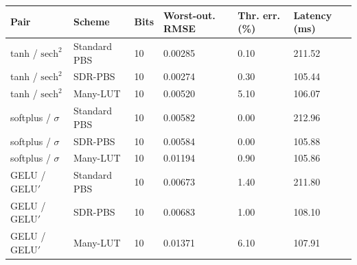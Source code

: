 \footnotesize
\setlength{\tabcolsep}{4pt}
\renewcommand{\arraystretch}{1.08}
\begin{tabular}{llllll}
\toprule
Pair & Scheme & Bits & Worst-out. RMSE & Thr. err. (\%) & Latency (ms) \\
\midrule
tanh / $\mathrm{sech}^2$ & Standard PBS & 10 & 0.00285 & 0.10 & 211.52 \\
tanh / $\mathrm{sech}^2$ & SDR-PBS & 10 & 0.00274 & 0.30 & 105.44 \\
tanh / $\mathrm{sech}^2$ & Many-LUT & 10 & 0.00520 & 5.10 & 106.07 \\
softplus / $\sigma$ & Standard PBS & 10 & 0.00582 & 0.00 & 212.96 \\
softplus / $\sigma$ & SDR-PBS & 10 & 0.00584 & 0.00 & 105.88 \\
softplus / $\sigma$ & Many-LUT & 10 & 0.01194 & 0.90 & 105.86 \\
GELU / GELU$'$ & Standard PBS & 10 & 0.00673 & 1.40 & 211.80 \\
GELU / GELU$'$ & SDR-PBS & 10 & 0.00683 & 1.00 & 108.10 \\
GELU / GELU$'$ & Many-LUT & 10 & 0.01371 & 6.10 & 107.91 \\
\bottomrule
\end{tabular}
